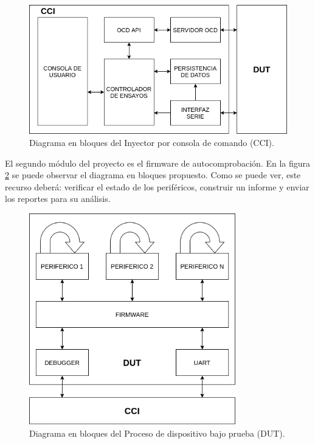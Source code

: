 \documentclass[
11pt, %
]{charter}
\begin{document}
\begin{figure}[htpb]
	\centering 
	\includegraphics[width=\textwidth]{./Figuras/CCIbloques.png}
	\caption{Diagrama en bloques del Inyector por consola de comando (CCI).}
	\label{fig:diagInyector}
\end{figure}

El segundo módulo del proyecto es el firmware de autocomprobación.
En la figura \ref{fig:diagSelfTesting} se puede observar el diagrama en bloques propuesto.
Como se puede ver, este recurso deberá: verificar el estado de los periféricos, construir un informe y enviar los reportes para su análisis.

\begin{figure}[htpb]
	\centering 
	\includegraphics[width=0.8\textwidth]{./Figuras/DUTbloques.png}
	\caption{Diagrama en bloques del Proceso de dispositivo bajo prueba (DUT).}
	\label{fig:diagSelfTesting}
\end{figure}
\end{document}
